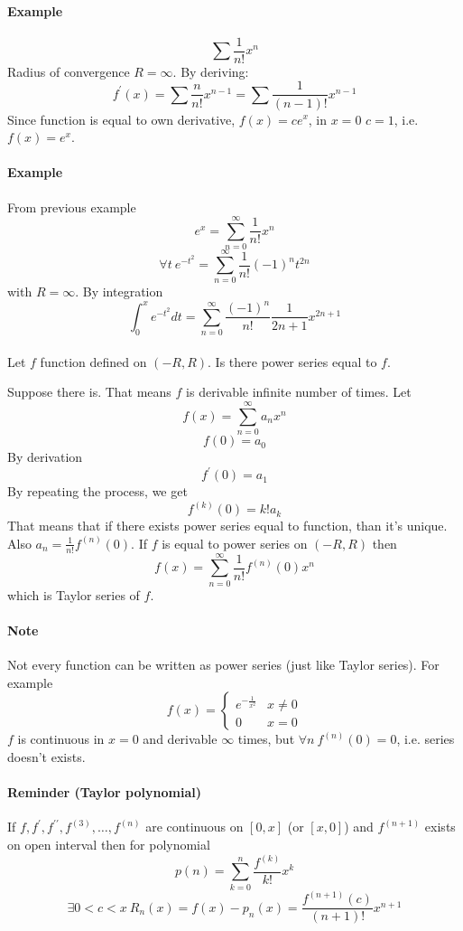 \paragraph{Example}
$$\sum \frac{1}{n!}x^n$$
Radius of convergence $R=\infty$.
By deriving:
$$f^\prime(x) = \sum \frac{n}{n!}x^{n-1} = \sum \frac{1}{(n-1)!}x^{n-1}$$
Since function is equal to own derivative, $f(x)= ce^x$, in $x=0$ $c=1$, i.e. $f(x) = e^x$.
\paragraph{Example}
From previous example
$$e^x =\sum_{n=0}^\infty \frac{1}{n!}x^n$$
$$\forall t \: e^{-t^2} = \sum_{n=0}^\infty \frac{1}{n!}(-1)^n t^{2n}$$
with $R=\infty$.
By integration
$$\int_0^x e^{-t^2}dt = \sum_{n=0}^\infty \frac{(-1)^n}{n!} \frac{1}{2n+1} x^{2n+1}$$
\paragraph{}
Let $f$ function defined on $(-R,R)$. Is there power series equal to $f$.

Suppose there is. That means $f$ is derivable infinite number of times. Let
$$f(x) = \sum_{n=0}^\infty a_n x^n$$
$$f(0) = a_0$$
By derivation
$$f^\prime(0) = a_1$$
By repeating the process, we get
$$f^{(k)}(0) = k!a_k$$
That means that if there exists power series equal to function, than it's unique. Also $a_n = \frac{1}{n!}f^{(n)}(0) $.
If $f$ is equal to power series on $(-R,R)$ then
$$f(x) = \sum_{n=0}^\infty \frac{1}{n!}f^{(n)}(0)x^n$$
which is Taylor series of $f$. 
\paragraph{Note} Not every function can be written as power series (just like Taylor series). For example
$$f(x) = \begin{cases}
e^{-\frac{1}{x^2}} & x\neq 0\\
0&x=0
\end{cases}$$
$f$ is continuous in $x=0$ and derivable $\infty$ times, but $\forall n \: f^{(n)}(0) = 0$, i.e. series doesn't exists.
\paragraph{Reminder (Taylor polynomial)}
If $f,f^\prime, f^{\prime \prime}, f^{(3)}, \dots, f^{(n)}$ are continuous on $[0,x]$ (or $[x,0]$) and $f^{(n+1)}$ exists on open interval then for polynomial
$$p(n) = \sum_{k=0}^n \frac{f^{(k)}}{k!}x^k$$
$$\exists 0<c<x \: R_n(x) = f(x) - p_n(x) = \frac{f^{(n+1)}(c)}{(n+1)!}x^{n+1}$$
